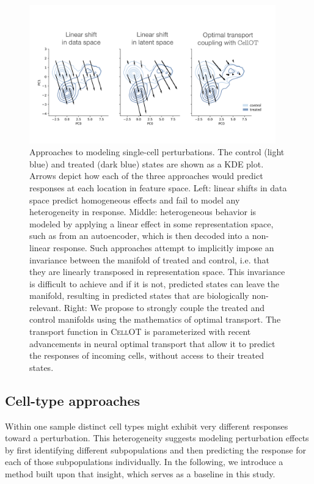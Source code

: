 \begin{figure}[ht]
  \begin{center}
    \includegraphics[width=0.95\textwidth]{figures/cellot-methods/arrow-cartoons.pdf}
  \end{center}
  \caption{
    Approaches to modeling single-cell perturbations.
    The control (light blue) and treated (dark blue) states are shown as a KDE plot.
    Arrows depict how each of the three approaches would predict responses at each location in feature space.
    Left: linear shifts in data space predict homogeneous effects and fail to model any heterogeneity in response.
    Middle: heterogeneous behavior is modeled by applying a linear effect in some representation space, such as from an autoencoder, which is then decoded into a non-linear response. Such approaches attempt to implicitly impose an invariance between the manifold of treated and control, i.e. that they are linearly transposed in representation space. This invariance is difficult to achieve \cite{locatello2019} and if it is not, predicted states can leave the manifold, resulting in predicted states that are biologically non-relevant.
    Right: We propose to strongly couple the treated and control manifolds using the mathematics of optimal transport. The transport function in \textsc{CellOT} is parameterized with recent advancements \cite{makkuva2020} in neural optimal transport that allow it to predict the responses of incoming cells, without access to their treated states.
  }
  \label{fig:arrows}
\end{figure}


\subsection{Cell-type approaches} 
Within one sample distinct cell types might exhibit very different responses toward a perturbation.
This heterogeneity suggests modeling perturbation effects by first identifying different subpopulations and then predicting the response for each of those subpopulations individually.
In the following, we introduce a method built upon that insight, which serves as a baseline in this study.

